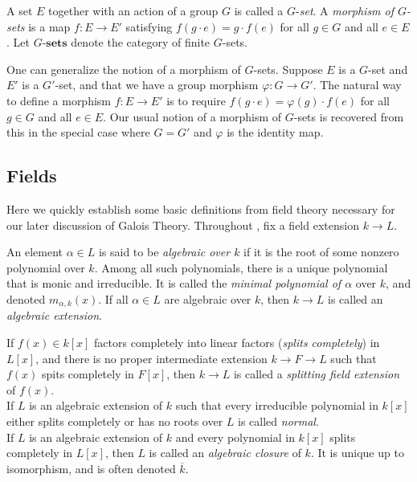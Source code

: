 \documentclass[11pt,openany]{book} %
\begin{document}
\begin{definition}
A set $E$ together with an action of a group $G$ is called a $G$-\emph{set}. A \emph{morphism of $G$-sets} is a map $f : E \to E'$ satisfying $f(g\cdot e) = g\cdot f(e)$ for all $g \in G$ and all $e \in E$. Let $G$-$\mathbf{sets}$ denote the category of finite $G$-sets.
\end{definition}

\begin{remark}
One can generalize the notion of a morphism of $G$-sets. Suppose $E$ is a $G$-set and $E'$ is a $G'$-set, and that we have a group morphism $\varphi : G \to G'$. The natural way to define a morphism $f : E \to E'$ is to require $f(g\cdot e) = \varphi(g)\cdot f(e)$ for all $g \in G$ and all $e \in E$. Our usual notion of a morphism of $G$-sets is recovered from this in the special case where $G = G'$ and $\varphi$ is the identity map.
\end{remark}


\subsection{Fields}

Here we quickly establish some basic definitions from field theory necessary for our later discussion of Galois Theory. Throughout , fix a field extension $k \to L$.\\

\begin{definition}
An element $\alpha \in L$ is said to be \emph{algebraic over $k$} if it is the root of some nonzero polynomial over $k$. Among all such polynomials, there is a unique polynomial that is monic and irreducible. It is called the \emph{minimal polynomial of $\alpha$} over $k$, and denoted $m_{\alpha,k}(x)$. If all $\alpha \in L$ are algebraic over $k$, then $k\to L$ is called an \emph{algebraic extension}.
\end{definition}

\begin{definition}
If $f(x)\in k[x]$ factors completely into linear factors (\emph{splits completely}) in $L[x]$, and there is no proper intermediate extension $k \to F \to L$ such that $f(x)$ spits completely in $F[x]$, then $k\to L$ is called a \emph{splitting field extension} of $f(x)$.\\

If $L$ is an algebraic extension of $k$ such that every irreducible polynomial in $k[x]$ either splits completely or has no roots over $L$ is called \emph{normal}.\\

If $L$ is an algebraic extension of $k$ and every polynomial in $k[x]$ splits completely in $L[x]$, then $L$ is called an \emph{algebraic closure} of $k$. It is unique up to isomorphism, and is often denoted $\overline{k}$.
\end{definition}
\end{document}
